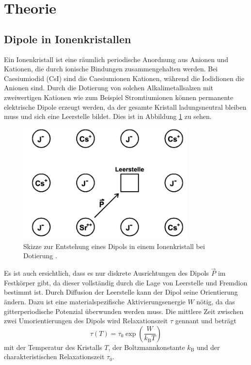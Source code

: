 \section{Theorie}
\label{sec:Theorie}

\subsection{Dipole in Ionenkristallen}
Ein Ionenkristall ist eine räumlich periodische Anordnung aus Anionen und Kationen, die durch ionische Bindungen zusammengehalten werden. Bei Caesiumiodid (CsI) sind die Caesiumionen  Kationen, während die Iodidionen  die Anionen sind.
Durch die Dotierung von solchen Alkalimetallsalzen mit zweiwertigen Kationen wie zum Beispiel Stromtiumionen  können permanente elektrische Dipole erzeugt werden, da der gesamte Kristall ladungsneutral bleiben muss und sich eine Leerstelle bildet. Dies ist in Abbildung \ref{fig:dipolIonenkristall} zu sehen.

\begin{figure}
  \centering
  \includegraphics[width=0.8\textwidth]{data/kristall.png}
  \caption{Skizze zur Entstehung eines Dipols in einem Ionenkristall bei Dotierung \cite{anleitungalt}.}
  \label{fig:dipolIonenkristall}
\end{figure}

Es ist auch ersichtlich, dass es nur diskrete Ausrichtungen des Dipols $\vec{P}$ im Festkörper gibt, da dieser vollständig durch die Lage von Leerstelle und Fremdion bestimmt ist. Durch Diffusion der Leerstelle kann der Dipol seine Orientierung ändern. Dazu ist eine materialspezifische Aktivierungsenergie $W$ nötig, da das gitterperiodische Potenzial überwunden werden muss. Die mittlere Zeit zwischen zwei Umorientierungen des Dipols wird Relaxationszeit $\tau$ gennant und beträgt
\begin{equation}
  \tau(T) = \tau_0 \exp\left(\frac{W}{k_{\text{B}}T}\right)
  \label{eqn:relaxtime}
\end{equation}
mit der Temperatur des Kristalls $T$, der Boltzmannkonstante $k_{\text{B}}$ und der charakteristischen Relaxationszeit $\tau_0$.

